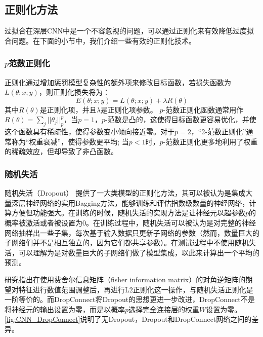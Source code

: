 \subsection{正则化方法}
过拟合在深层CNN中是一个不容忽视的问题，可以通过正则化来有效降低过度拟合问题。在下面的小节中，我们介绍一些有效的正则化技术。
\subsubsection{$p$范数正则化}
正则化通过增加惩罚模型复杂性的额外项来修改目标函数，若损失函数为$L(\theta; x; y)$，则正则化损失将为：
\begin{equation}
E(\theta ; x; y)= L(\theta ; x; y)+\lambda R(\theta ) 
\end{equation}
其中$R(\theta)$是正则化项，并且$\lambda$是正则化项参数。
$p$-范数正则化函数通常用作$R(\theta)=\sum_j||\theta_j||_p^p$，当$p=1$，$p$-范数是凸的，这使得目标函数更容易优化，并使这个函数具有稀疏性，使得参数变小倾向接近零。对于$p = 2$，“2-范数正则化”通常称为“权重衰减”，使得参数更平均; 当$p<1$时，$p$-范数正则化更多地利用了权重的稀疏效应，但却导致了非凸函数。
\subsubsection{随机失活}
\label{Section Dropout}
随机失活（Dropout）\cite{Srivastava2014a} 提供了一大类模型的正则化方法，其可以被认为是集成大量深层神经网络的实用Bagging方法，能够训练和评估指数级数量的神经网络，计算方便但功能强大。在训练的时候，随机失活的实现方法是让神经元以超参数$p$的概率被激活或者被设置为0。在训练过程中，随机失活可以被认为是对完整的神经网络抽样出一些子集，每次基于输入数据只更新子网络的参数（然而，数量巨大的子网络们并不是相互独立的，因为它们都共享参数）。在测试过程中不使用随机失活，可以理解为是对数量巨大的子网络们做了模型集成，以此来计算出一个平均的预测。

研究指出在使用费舍尔信息矩阵（fisher information matrix）的对角逆矩阵的期望对特征进行数值范围调整后，再进行L2正则化这一操作，与随机失活正则化是一阶等价的。而DropConnect\cite{Wan2013Regularization}将Dropout的思想更进一步改进，DropConnect不是将神经元的输出设置为零，而是以概率$ p $选择完全连接层的权重$ W $设置为零。\figurename {\ref{fig:CNN_DropConnect}}说明了无Dropout，Dropout和DropConnect网络之间的差异。

